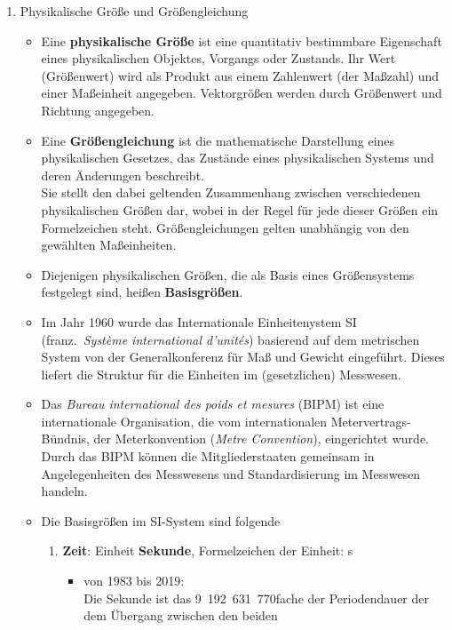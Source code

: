 \begin{raggedright}
\begin{enumerate}
\item Physikalische Größe und Größengleichung
	\begin{itemize}
	\item Eine \textbf{physikalische Größe} ist eine quantitativ bestimmbare Eigenschaft
	eines physikalischen Objektes, Vorgangs oder Zustands.
	Ihr Wert (Größenwert) wird als Produkt aus einem Zahlenwert (der Maßzahl) und
	einer Maßeinheit angegeben. Vektorgrößen werden durch Größenwert und Richtung angegeben.
	\item Eine \textbf{Größengleichung} ist die mathematische Darstellung eines physikalischen Gesetzes,
	das Zustände eines physikalischen Systems und deren Änderungen beschreibt.\\
	Sie stellt den dabei geltenden Zusammenhang zwischen verschiedenen physikalischen Größen dar,
	wobei in der Regel für jede dieser Größen ein Formelzeichen steht. Größengleichungen gelten unabhängig
	von den gewählten Maßeinheiten.
	\item Diejenigen physikalischen Größen, die als Basis eines Größensystems festgelegt sind,
	heißen \textbf{Basisgrößen}.
	\item Im Jahr 1960 wurde das Internationale Einheitenystem SI (franz.\
	\textsl{Syst{\`e}me international d'unit{\'e}s}) basierend auf dem metrischen System
	von der Generalkonferenz für Maß und Gewicht eingeführt. Dieses liefert die
	Struktur für die Einheiten im (gesetzlichen) Messwesen.
	\item Das \textsl{Bureau international des poids et mesures} (BIPM) ist eine internationale
	Organisation, die vom internationalen Metervertrags-Bündnis, der Meterkonvention (\textsl{Metre Convention}), eingerichtet wurde.
	Durch das BIPM können die Mitgliederstaaten gemeinsam in Angelegenheiten des Messwesens und
	Standardisierung im Messwesen handeln.
	\item Die Basisgrößen im SI-System sind folgende
		\begin{enumerate}[1.)]
		\item \textbf{Zeit}: Einheit \textbf{Sekunde}, Formelzeichen der Einheit: s
			\begin{itemize}
			\item von 1983 bis 2019:\\
			Die Sekunde ist das 9~192~631~770fache der Periodendauer
			der dem Übergang zwischen den beiden

\end{itemize}
\end{enumerate}
\end{itemize}
\end{enumerate}
\end{raggedright}
